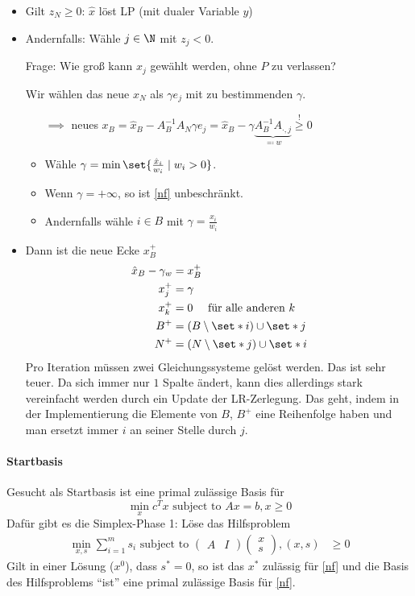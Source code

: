 \begin{itemize}
	\item Gilt $z_{N} \geq 0$: $\hat{x}$ löst LP (mit dualer Variable $y$)
	\item Andernfalls: Wähle $j\in \N$ mit $z_{j}<0$.

		Frage: Wie groß kann $x_{j}$ gewählt werden, ohne $P$ zu verlassen?

		Wir wählen das neue $x_{N}$ als $\gamma e_{j}$ mit zu bestimmenden $\gamma$.
		\begin{itemize}
      \item[$\implies$] neues $x_{B}
        = \hat{x}_{B} - A_{B}^{-1}A_{N}\gamma e_{j}
        = \hat{x}_{B} - \gamma \underbrace{A_{B}^{-1}A_{\cdot,j}}_{\eqqcolon w}
        \overset{!}{\geq} 0$
			\item Wähle $\gamma = \min \set{ \frac{\hat{x}_{i}}{w_{i}} \mid w_{i} > 0 }$.
      \item Wenn $\gamma = + \infty$, so ist \eqref{nf} unbeschränkt.
			\item Andernfalls wähle $i \in B$ mit $\gamma = \frac{\hat{x}_{i}}{w_{i}}$
		\end{itemize}
  \item Dann ist die neue Ecke $x_B^+$
		\begin{align*}
			\hat{x}_{B}-\gamma_{w}&= x_{B}^+\\
			x_{j}^+& = \gamma\\
			x_{k}^+ &= 0 \quad \text{ für alle anderen } k\\
			B^+ &= (B \setminus \set*{i})\cup \set*{j}\\
			N^+ &= (N \setminus \set*{j})\cup \set*{i}
		\end{align*}
    Pro Iteration müssen zwei Gleichungssysteme gelöst werden. Das ist sehr teuer. Da sich immer nur $1$ Spalte ändert, kann dies allerdings stark vereinfacht werden durch ein Update der LR-Zerlegung. Das geht, indem in der Implementierung die Elemente von $B$, $B^+$ eine Reihenfolge haben und man ersetzt immer $i$ an seiner Stelle durch $j$.
\end{itemize}
\paragraph{Startbasis}
Gesucht als Startbasis ist eine primal zulässige Basis für
\begin{equation*}
	\min_{x} c^Tx \text{ subject to } Ax = b , x \geq 0
\end{equation*}
Dafür gibt es die Simplex-Phase 1: Löse das Hilfsproblem
\begin{align*}
	\min_{x,s} \sum_{i=1}^{m} s_{i} \text{ subject to }
	\begin{pmatrix}
		A& I
	\end{pmatrix}
	\begin{pmatrix}
		x \\ s
	\end{pmatrix}
	, (x,s)& \geq 0
\end{align*}
Gilt in einer Lösung ($x^0$), dass $s^* =0$, so ist das $x^*$ zulässig für \eqref{nf} und die Basis des Hilfsproblems \enquote{ist} eine primal zulässige Basis für \eqref{nf}.

